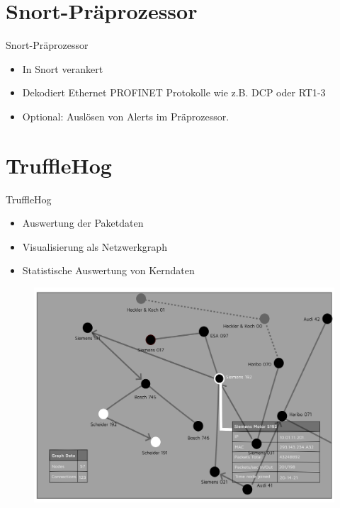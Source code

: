 \documentclass[18pt]{beamer}
\begin{document}
\section{Snort-Präprozessor}
\begin{frame}{Snort-Präprozessor}
    \begin{itemize}
      \item In Snort verankert
      \pause
      \item Dekodiert Ethernet PROFINET Protokolle wie z.B. DCP oder RT1-3
      \pause
      \item Optional: Auslösen von Alerts im Präprozessor.
    \end{itemize}
\end{frame}


\section{TruffleHog}
\begin{frame}{TruffleHog}
    \begin{itemize}
      \item Auswertung der Paketdaten
      \pause
      \item Visualisierung als Netzwerkgraph
      \pause
	  \item Statistische Auswertung von Kerndaten
    \end{itemize}
\end{frame}

\begin{frame}
	\begin{figure}
		\includegraphics[height=0.95\textheight]{./images/GUI.png}
	\end{figure}
\end{frame}
\end{document}
